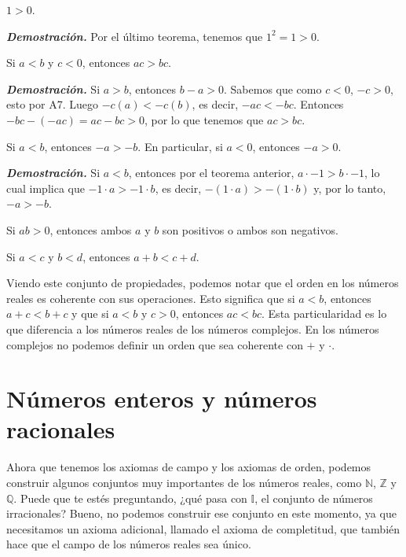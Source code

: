 \documentclass{report}
\begin{document}
    \begin{thBox}
        $1 > 0$.
    \end{thBox}
    \textit{\textbf{Demostración.}} Por el último teorema, tenemos que $1^2 = 1 >0$.\\
    
    \begin{thBox}
        Si $a<b$ y $c<0$, entonces $ac>bc$.
    \end{thBox}
    \textit{\textbf{Demostración.}} Si $a>b$, entonces $b-a>0$. Sabemos que como $c<0$, $-c>0$, esto por A7. Luego $-c(a) < -c(b)$, es decir, $-ac < -bc$. Entonces $-bc - (-ac) = ac-bc > 0$, por lo que tenemos que $ac>bc$.\\
    
    \begin{thBox}
        Si $a<b$, entonces $-a>-b$. En particular, si $a<0$, entonces $-a>0$.
    \end{thBox}
    \textit{\textbf{Demostración.}} Si $a<b$, entonces por el teorema anterior, $a \cdot -1 > b \cdot -1$, lo cual implica que $-1 \cdot a > -1 \cdot b$, es decir, $-(1 \cdot a) > -(1 \cdot b)$ y, por lo tanto, $-a>-b$.\\
    
    \begin{thBox}
        Si $ab>0$, entonces ambos $a$ y $b$ son positivos o ambos son negativos.
    \end{thBox}
    
    \begin{thBox}
        Si $a<c$ y $b<d$, entonces $a+b<c+d$.
    \end{thBox}
    
    Viendo este conjunto de propiedades, podemos notar que el orden en los números reales es coherente con sus operaciones. Esto significa que si $a<b$, entonces $a+c<b+c$ y que si $a<b$ y $c>0$, entonces $ac < bc$. Esta particularidad es lo que diferencia a los números reales de los números complejos. En los números complejos no podemos definir un orden que sea coherente con $+$ y $\cdot$.
    
    \section{Números enteros y números racionales}
    
    Ahora que tenemos los axiomas de campo y los axiomas de orden, podemos construir algunos conjuntos muy importantes de los números reales, como $\mathbb{N}$, $\mathbb{Z}$ y $\mathbb{Q}$. Puede que te estés preguntando, ¿qué pasa con $\mathbb{I}$, el conjunto de números irracionales? Bueno, no podemos construir ese conjunto en este momento, ya que necesitamos un axioma adicional, llamado el axioma de completitud, que también hace que el campo de los números reales sea único.
    
\end{document}
